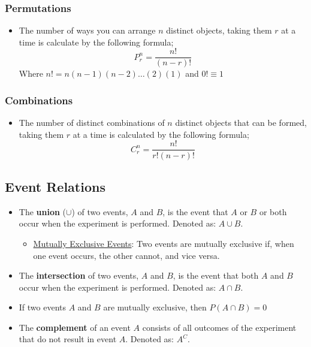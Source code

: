 \documentclass[12pt, letterpaper]{article}
\begin{document}
            \subsubsection{Permutations}
                \begin{itemize}
                    \item The number of ways you can arrange $n$ distinct objects, taking them $r$ at a time is calculate by the following formula;
                        \begin{equation}
                            P^n_r = \frac{n!}{(n - r)!}
                        \end{equation}
                        Where $n! = n(n - 1)(n - 2)\dots (2)(1)$ and $0! \equiv 1$
                \end{itemize}
            \subsubsection{Combinations}
                \begin{itemize}
                    \item The number of distinct combinations of $n$ distinct objects that can be formed, taking them $r$ at a time is calculated by the following formula;
                        \begin{equation}
                            C^n_r = \frac{n!}{r!(n - r)!}
                        \end{equation}
                \end{itemize}
        \subsection{Event Relations}
            \begin{itemize}
                \item The \textbf{union} ($\cup$) of two events, $A$ and $B$, is the event that $A$ or $B$ or both occur when the experiment is performed. Denoted as: $A\cup B$.
                    \begin{itemize}
                        \item \underline{Mutually Exclusive Events}: Two events are mutually exclusive if, when one event occurs, the other cannot, and vice versa.
                    \end{itemize}
                \item The \textbf{intersection} of two events, $A$ and $B$, is the event that both $A$ and $B$ occur when the experiment is performed. Denoted as: $A\cap B$. 
                \item If two events $A$ and $B$ are mutually exclusive, then $P(A\cap B) = 0$
                \item The \textbf{complement} of an event $A$ consists of all outcomes of the experiment that do not result in event $A$. Denoted as: $A^C$.
            \end{itemize}
\end{document}
